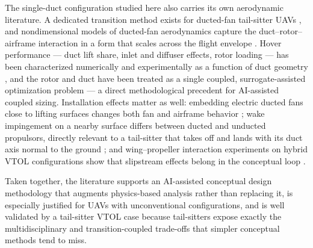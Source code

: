 The single-duct configuration studied here also carries its own
aerodynamic literature. A dedicated transition method exists for
ducted-fan tail-sitter UAVs \citep{zhang2013}, and nondimensional
models of ducted-fan aerodynamics capture the duct--rotor--airframe
interaction in a form that scales across the flight envelope
\citep{ohanian2012}. Hover performance --- duct lift share, inlet
and diffuser effects, rotor loading --- has been characterized
numerically \citep{sheng2015} and experimentally as a function of
duct geometry \citep{dorfling2023}, and the rotor and duct have been
treated as a single coupled, surrogate-assisted optimization problem
\citep{qing2019} --- a direct methodological precedent for
AI-assisted coupled sizing. Installation effects matter as well:
embedding electric ducted fans close to lifting surfaces changes
both fan and airframe behavior \citep{alabdali2025}; wake
impingement on a nearby surface differs between ducted and unducted
propulsors, directly relevant to a tail-sitter that takes off and
lands with its duct axis normal to the ground \citep{kopperstad2025};
and wing--propeller interaction experiments on hybrid VTOL
configurations show that slipstream effects belong in the conceptual
loop \citep{hrishikeshavan2013,hrishikeshavan2014}.

Taken together, the literature supports an AI-assisted conceptual
design methodology that augments physics-based analysis rather than
replacing it, is especially justified for UAVs with unconventional
configurations, and is well validated by a tail-sitter VTOL case
because tail-sitters expose exactly the multidisciplinary and
transition-coupled trade-offs that simpler conceptual methods tend to
miss.
